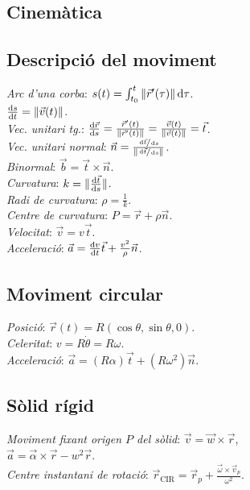 \documentclass[10pt]{article}
\newcommand{\ci}{\textbullet\;}
\begin{document}
\ifland
\raggedright
\begin{multicols}{3}
\fi

\section{Cinem\`atica}

\subsection{Descripci\'o del moviment}
\emph{Arc d'una corba}: $s(t) = \int^t_{t_0} \|\vec{r}'(\tau)\| \dif\tau$. \\
\ci $\frac{\dif s}{\dif t} = \|\vec{v}(t)\|$. \\
\emph{Vec. unitari tg.}: $\frac{\dif \vec{r}}{\dif s} = \frac{\vec{r}'(t)}{\|\vec{r}'(t)\|} = \frac{\vec{v}(t)}{\|\vec{v}(t)\|} = \vec{t}$. \\
\emph{Vec. unitari normal}: $\vec{n} = \frac{\sfrac{\dif \vec{t}}{\dif s}}{\|\sfrac{\dif \vec{t}}{\dif s}\|}$. \\
\emph{Binormal}: $\vec{b} = \vec{t} \times \vec{n}$. \\
\emph{Curvatura}: $k = \|\frac{\dif \vec{t}}{\dif s}\|$. \\
\emph{Radi de curvatura}: $\rho = \frac{1}{k}$. \\
\emph{Centre de curvatura}: $P = \vec{r} + \rho\vec{n}$.\\
\emph{Velocitat}: $\vec{v} = v\vec{t}$. \\
\emph{Acceleraci\'o}: $\vec{a} = \frac{\dif v}{\dif t}\vec{t} + \frac{v^2}{\rho}\vec{n}$.

\subsection{Moviment circular}
\emph{Posici\'o}: $\vec{r}(t) = R(\cos \theta, \sin \theta, 0)$. \\
\emph{Celeritat}: $v = R\dot\theta = R\omega$. \\
\emph{Acceleraci\'o}: $\vec{a} = (R\alpha)\vec{t} + (R\omega^2)\vec{n}$.

\subsection{S\`olid r\'igid}
\emph{Moviment fixant origen $P$ del sòlid}: $\vec{v} = \vec{w} \times \vec{r}$,\\
$\vec{a} =  \vec{\alpha} \times \vec{r} - w^2 \vec{r}$.\\
\emph{Centre instantani de rotaci\'o}: $\vec{r}_{\text{CIR}} = \vec{r}_p + \frac{\vec{\omega} \times \vec{v}_p}{\omega^2}$.



\end{multicols}
\end{document}
